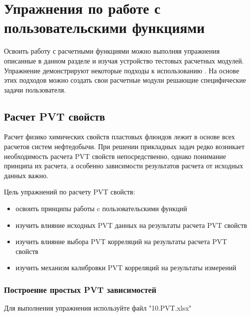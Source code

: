 \chapter{Упражнения по работе с пользовательскими функциями \unf}

Освоить работу с расчетными функциями \unf можно выполняя упражнения описанные в данном разделе и изучая устройство тестовых расчетных модулей. Упражнение демонстрируют некоторые подходы к использованию \unf. На основе этих подходов можно создать свои расчетные модули решающие специфические задачи пользователя. 

\section{Расчет PVT свойств}

Расчет физико химических свойств пластовых флюидов лежит в основе всех расчетов систем нефтедобычи. При решении прикладных задач редко возникает необходимость расчета PVT свойств непосредственно, однако понимание принципа их расчета, а особенно зависимости результатов расчета от исходных данных важно.
	
Цель упражнений по расчету PVT свойств:
\begin{itemize}	
	\item 	освоить принципы работы c пользовательскими функций \unf 
	\item 	изучить влияние исходных PVT данных на результаты расчета PVT свойств
	\item 	изучить влияние выбора PVT корреляций на результаты расчета PVT свойств
	\item 	изучить механизм калибровки PVT корреляций на результаты измерений
\end{itemize}
	 
	 
\subsection{Построение простых PVT зависимостей}

Для выполнения упражнения используйте файл "10.PVT.xlsx"

